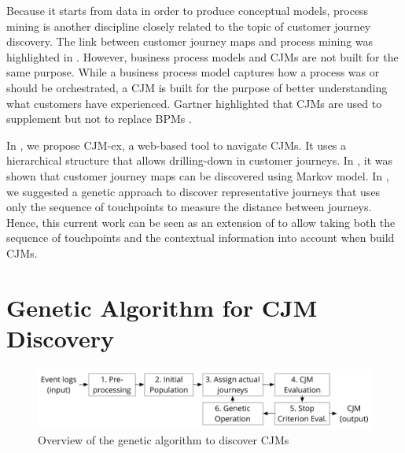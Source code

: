 \documentclass[runningheads]{llncs}
\begin{document}
Because it starts from data in order to produce conceptual models, process mining is another discipline closely related to the topic of customer journey discovery. The link between customer journey maps and process mining was highlighted in \cite{bernard2017cjm}. However, business process models and CJMs are not built for the same purpose. While a business process model captures how a process was or should be orchestrated, a CJM is built for the purpose of better understanding what customers have experienced. Gartner highlighted that CJMs are used to supplement but not to replace BPMs \cite{Gartner2015}.

In \cite{bernard2017cjmEX}, we propose CJM-ex, a web-based tool to navigate CJMs. It uses a hierarchical structure that allows drilling-down in customer journeys. In \cite{bernard2017Markov}, it was shown that customer journey maps can be discovered using Markov model. In \cite{bernard2019genetic}, we suggested a genetic approach to discover representative journeys that uses only the sequence of touchpoints to measure the distance between journeys. Hence, this current work can be seen as an extension of \cite{bernard2019genetic} to allow taking both the sequence of touchpoints and the contextual information into account when build CJMs. 


\section{Genetic Algorithm for CJM Discovery}


\begin{figure}[H]
\centering
\includegraphics[width=0.8\columnwidth]{05_schema/process.pdf}
  \caption{Overview of the genetic algorithm to discover CJMs}
  \label{fig:process}
\end{figure}
\end{document}
